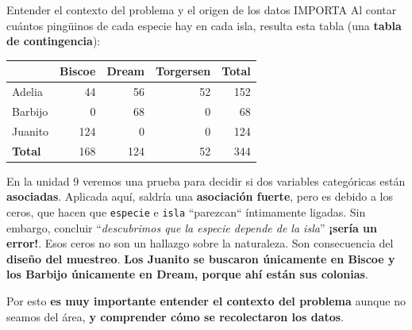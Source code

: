 \documentclass[aspectratio=169,10pt]{beamer}
\newcommand{\destaca}[1]{%
  \par\vspace{3pt}\noindent
  \colorbox{azulClaro}{%
    \parbox{\dimexpr\linewidth-2\fboxsep\relax}{\vspace{3pt}#1\vspace{3pt}}}%
  \par\vspace{3pt}}
\begin{document}
\begin{frame}{Entender el contexto del problema y el origen de los datos IMPORTA}
  Al contar cuántos pingüinos de cada especie hay en cada isla, resulta esta tabla
  (una \textbf{tabla de contingencia}):

  \centering
  {\small
  \begin{tabular}{@{}lrrrr@{}}
    \toprule
    & \textbf{Biscoe} & \textbf{Dream} & \textbf{Torgersen} & \textbf{Total} \\
    \midrule
    Adelia  & 44 & 56 & 52 & 152 \\
    Barbijo & 0  & 68 & 0  & 68 \\
    Juanito & 124 & 0 & 0  & 124 \\
    \midrule
    \textbf{Total} & 168 & 124 & 52 & 344 \\
    \bottomrule
  \end{tabular}}

  \vspace{0.3cm}
  \raggedright
  En la unidad 9 veremos una prueba para decidir si dos variables categóricas están
  \textbf{asociadas}. Aplicada aquí, saldría una \textbf{asociación fuerte}, pero es debido a los ceros, que hacen que \texttt{especie} e \texttt{isla} ``parezcan`` íntimamente ligadas. Sin embargo, concluir ``\emph{descubrimos que la especie depende de la isla}'' \textbf{¡sería un error!}. Esos ceros no son un hallazgo sobre la naturaleza. Son consecuencia
  del \textbf{diseño del muestreo}. \textbf{Los Juanito se buscaron únicamente en Biscoe y los
  Barbijo únicamente en Dream, porque ahí están sus colonias}.

  \vspace{0.2cm}
  \destaca{
  Por esto \textbf{es muy importante entender el contexto del problema} aunque no seamos del área,  \textbf{y comprender cómo se recolectaron los datos}.}
\end{frame}

\end{document}
